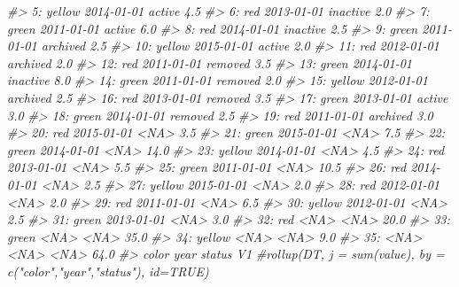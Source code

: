 \documentclass[
]{book}
\newenvironment{Shaded}{\begin{snugshade}}{\end{snugshade}}
\newcommand{\CommentTok}[1]{\textcolor[rgb]{0.56,0.35,0.01}{\textit{#1}}}
\begin{document}
\begin{Shaded}
\begin{Highlighting}[]
\CommentTok{\#\textgreater{}  5: yellow 2014{-}01{-}01   active  4.5}
\CommentTok{\#\textgreater{}  6:    red 2013{-}01{-}01 inactive  2.0}
\CommentTok{\#\textgreater{}  7:  green 2011{-}01{-}01   active  6.0}
\CommentTok{\#\textgreater{}  8:    red 2014{-}01{-}01 inactive  2.5}
\CommentTok{\#\textgreater{}  9:  green 2011{-}01{-}01 archived  2.5}
\CommentTok{\#\textgreater{} 10: yellow 2015{-}01{-}01   active  2.0}
\CommentTok{\#\textgreater{} 11:    red 2012{-}01{-}01 archived  2.0}
\CommentTok{\#\textgreater{} 12:    red 2011{-}01{-}01  removed  3.5}
\CommentTok{\#\textgreater{} 13:  green 2014{-}01{-}01 inactive  8.0}
\CommentTok{\#\textgreater{} 14:  green 2011{-}01{-}01  removed  2.0}
\CommentTok{\#\textgreater{} 15: yellow 2012{-}01{-}01 archived  2.5}
\CommentTok{\#\textgreater{} 16:    red 2013{-}01{-}01  removed  3.5}
\CommentTok{\#\textgreater{} 17:  green 2013{-}01{-}01   active  3.0}
\CommentTok{\#\textgreater{} 18:  green 2014{-}01{-}01  removed  2.5}
\CommentTok{\#\textgreater{} 19:    red 2011{-}01{-}01 archived  3.0}
\CommentTok{\#\textgreater{} 20:    red 2015{-}01{-}01     \textless{}NA\textgreater{}  3.5}
\CommentTok{\#\textgreater{} 21:  green 2015{-}01{-}01     \textless{}NA\textgreater{}  7.5}
\CommentTok{\#\textgreater{} 22:  green 2014{-}01{-}01     \textless{}NA\textgreater{} 14.0}
\CommentTok{\#\textgreater{} 23: yellow 2014{-}01{-}01     \textless{}NA\textgreater{}  4.5}
\CommentTok{\#\textgreater{} 24:    red 2013{-}01{-}01     \textless{}NA\textgreater{}  5.5}
\CommentTok{\#\textgreater{} 25:  green 2011{-}01{-}01     \textless{}NA\textgreater{} 10.5}
\CommentTok{\#\textgreater{} 26:    red 2014{-}01{-}01     \textless{}NA\textgreater{}  2.5}
\CommentTok{\#\textgreater{} 27: yellow 2015{-}01{-}01     \textless{}NA\textgreater{}  2.0}
\CommentTok{\#\textgreater{} 28:    red 2012{-}01{-}01     \textless{}NA\textgreater{}  2.0}
\CommentTok{\#\textgreater{} 29:    red 2011{-}01{-}01     \textless{}NA\textgreater{}  6.5}
\CommentTok{\#\textgreater{} 30: yellow 2012{-}01{-}01     \textless{}NA\textgreater{}  2.5}
\CommentTok{\#\textgreater{} 31:  green 2013{-}01{-}01     \textless{}NA\textgreater{}  3.0}
\CommentTok{\#\textgreater{} 32:    red       \textless{}NA\textgreater{}     \textless{}NA\textgreater{} 20.0}
\CommentTok{\#\textgreater{} 33:  green       \textless{}NA\textgreater{}     \textless{}NA\textgreater{} 35.0}
\CommentTok{\#\textgreater{} 34: yellow       \textless{}NA\textgreater{}     \textless{}NA\textgreater{}  9.0}
\CommentTok{\#\textgreater{} 35:   \textless{}NA\textgreater{}       \textless{}NA\textgreater{}     \textless{}NA\textgreater{} 64.0}
\CommentTok{\#\textgreater{}      color       year   status   V1}
\CommentTok{\#rollup(DT, j = sum(value), by = c("color","year","status"), id=TRUE)}
\end{Highlighting}
\end{Shaded}
\end{document}
